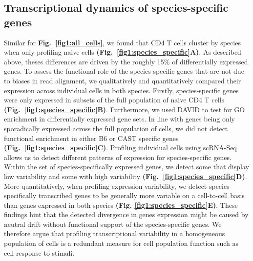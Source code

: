 \subsection{Transcriptional dynamics of species-specific genes}
\label{sec1:species-spec-dynamics}

Similar for \textbf{Fig.~\ref{fig1:all_cells}}, we found that CD4\plus{} T cells cluster by species when only profiling naive cells \textbf{(Fig.~\ref{fig1:species_specific}A)}. As described above, theses differences are driven by the roughly 15\% of differentially expressed genes. To assess the functional role of the species-specific genes that are not due to biases in read alignment, we qualitatively and quantitatively compared their expression across individual cells in both species. Firstly, species-specific genes were only expressed in subsets of the full population of naive CD4\plus{} T cells \textbf{(Fig.~\ref{fig1:species_specific}B)}. Furthermore, we used DAVID \citep{Dennis2003} to test for \gls{GO} enrichment in differentially expressed gene sets. In line with genes being only sporadically expressed across the full population of cells, we did not detect functional enrichment in either B6 or CAST specific genes \textbf{(Fig.~\ref{fig1:species_specific}C)}. Profiling individual cells using scRNA-Seq allows us to detect different patterns of expression for species-specific genes. Within the set of species-specifically expressed genes, we detect some that display low variability and some with high variability \textbf{(Fig.~\ref{fig1:species_specific}D)}. More quantitatively, when profiling expression variability, we detect species-specifically transcribed genes to be generally more variable on a cell-to-cell basis than genes expressed in both species \textbf{(Fig. \ref{fig1:species_specific}E)}. These findings hint that the detected divergence in genes expression might be caused by neutral drift without functional support of the species-specific genes. We therefore argue that profiling transcriptional variability in a homogeneous population of cells is a redundant measure for cell population function such as cell response to stimuli.

\newpage

